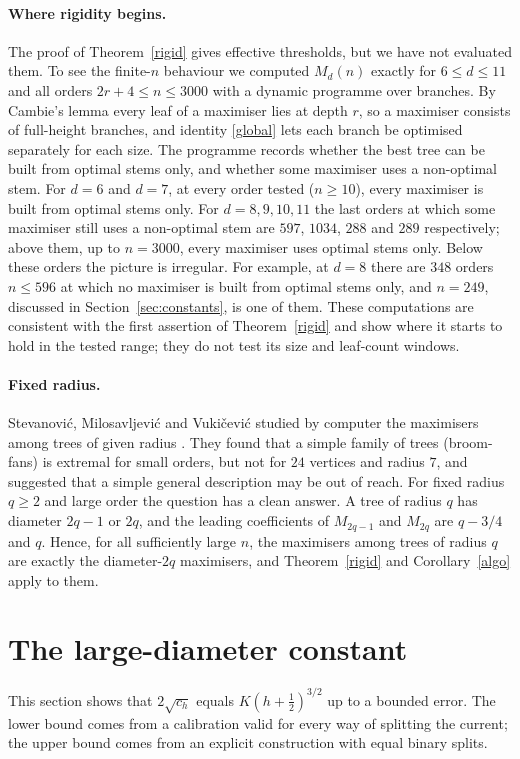 \documentclass[11pt,a4paper]{article}
\theoremstyle{remark}
\begin{document}
\paragraph{Where rigidity begins.} The proof of Theorem~\ref{rigid} gives effective thresholds, but we have not evaluated them. To see the finite-$n$ behaviour we computed $M_d(n)$ exactly for $6\le d\le11$ and all orders $2r+4\le n\le3000$ with a dynamic programme over branches. By Cambie's lemma \cite[Lemma~4.1]{cambie} every leaf of a maximiser lies at depth $r$, so a maximiser consists of full-height branches, and identity \eqref{global} lets each branch be optimised separately for each size. The programme records whether the best tree can be built from optimal stems only, and whether some maximiser uses a non-optimal stem. For $d=6$ and $d=7$, at every order tested ($n\ge10$), every maximiser is built from optimal stems only. For $d=8,9,10,11$ the last orders at which some maximiser still uses a non-optimal stem are $597$, $1034$, $288$ and $289$ respectively; above them, up to $n=3000$, every maximiser uses optimal stems only. Below these orders the picture is irregular. For example, at $d=8$ there are $348$ orders $n\le596$ at which no maximiser is built from optimal stems only, and $n=249$, discussed in Section~\ref{sec:constants}, is one of them. These computations are consistent with the first assertion of Theorem~\ref{rigid} and show where it starts to hold in the tested range; they do not test its size and leaf-count windows.

\paragraph{Fixed radius.} Stevanović, Milosavljević and Vukičević studied by computer the maximisers among trees of given radius \cite[\S5]{radius}. They found that a simple family of trees (broom-fans) is extremal for small orders, but not for $24$ vertices and radius $7$, and suggested that a simple general description may be out of reach. For fixed radius $q\ge2$ and large order the question has a clean answer. A tree of radius $q$ has diameter $2q-1$ or $2q$, and the leading coefficients of $M_{2q-1}$ and $M_{2q}$ are $q-3/4$ and $q$. Hence, for all sufficiently large $n$, the maximisers among trees of radius $q$ are exactly the diameter-$2q$ maximisers, and Theorem~\ref{rigid} and Corollary~\ref{algo} apply to them.

\section{The large-diameter constant}\label{sec:mesh}
This section shows that $2\sqrt{c_h}$ equals $K(h+\frac12)^{3/2}$ up to a bounded error. The lower bound comes from a calibration valid for every way of splitting the current; the upper bound comes from an explicit construction with equal binary splits.
\end{document}
